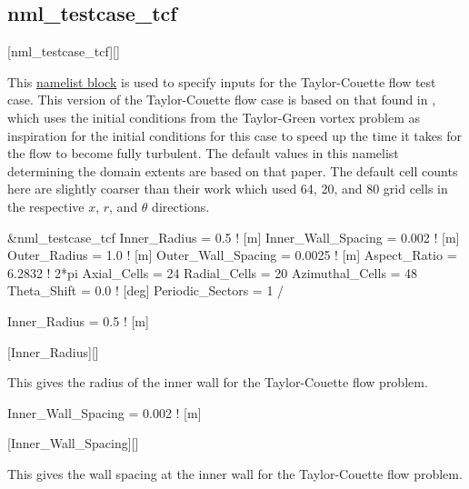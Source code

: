 \subsection{nml\_testcase\_tcf}
\label{SEC:nml_testcase_tcf}
\inp*[nmlTestcaseTCF]{}[nml\_testcase\_tcf][]

This \hyperref[SEC:User_Input]{namelist block}
is used to specify inputs for the Taylor-Couette flow test case.
%
This version of the Taylor-Couette flow case is based on that found
in , which uses the initial conditions from the Taylor-Green
vortex problem as inspiration for the initial conditions for this case to speed
up the time it takes for the flow to become fully turbulent.
%
The default values in this namelist determining the domain extents are based on
that paper.
%
The default cell counts here are slightly coarser than their work which used
64, 20, and 80 grid cells in the respective $x$, $r$, and $\theta$ directions.

\begin{nmlblocklst}[
,label={LST:nml_testcase_tcf}
,caption={Namelist nml\_testcase\_tcf.}
]
&nml_testcase_tcf
  Inner_Radius       = 0.5     ! [m]
  Inner_Wall_Spacing = 0.002   ! [m]
  Outer_Radius       = 1.0     ! [m]
  Outer_Wall_Spacing = 0.0025  ! [m]
  Aspect_Ratio       = 6.2832  ! 2*pi
  Axial_Cells        = 24
  Radial_Cells       = 20
  Azimuthal_Cells    = 48
  Theta_Shift        = 0.0     ! [deg]
  Periodic_Sectors   = 1
/
\end{nmlblocklst}


\begin{nmldescitem}
Inner_Radius = 0.5  ! [m]
\end{nmldescitem}
[Inner\_Radius][]

\begin{nmldescbody}
This gives the radius of the inner wall for the Taylor-Couette flow problem.
\end{nmldescbody}


\begin{nmldescitem}
Inner_Wall_Spacing = 0.002  ! [m]
\end{nmldescitem}
[Inner\_Wall\_Spacing][]

\begin{nmldescbody}
This gives the wall spacing at the inner wall for the Taylor-Couette flow
problem.
\end{nmldescbody}

